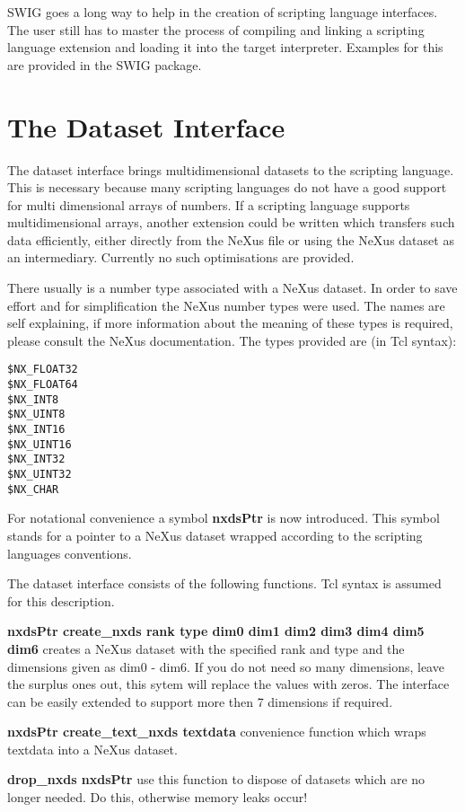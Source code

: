 \documentclass[12pt,a4paper]{article}
\begin{document}
SWIG goes a long way to help in the creation of scripting language
interfaces. The user still has to master the process of compiling and
linking a scripting language extension and loading it into the target
interpreter. Examples for this are provided in the SWIG package.  


\section{The Dataset Interface}
The dataset interface brings multidimensional datasets  to the
scripting language. This is necessary because many scripting languages
do not have a good support for multi dimensional arrays of numbers. 
If a scripting language supports
multidimensional  arrays, another extension could be written which
transfers such data efficiently, either directly from the NeXus file
or using the NeXus dataset as an intermediary. 
Currently no such optimisations are provided.  

There usually is a number type associated with a NeXus dataset. In
order to save effort and for simplification the NeXus number types
were used. The names are self explaining, if more information about
the meaning of these types is required, please consult the NeXus
documentation. The types provided are (in Tcl syntax):
\begin{verbatim}  
$NX_FLOAT32
$NX_FLOAT64
$NX_INT8  
$NX_UINT8   
$NX_INT16
$NX_UINT16
$NX_INT32
$NX_UINT32
$NX_CHAR
\end{verbatim}

For notational convenience a symbol {\bf nxdsPtr} is now
introduced. This symbol stands for a pointer to a NeXus dataset
wrapped according to the scripting languages conventions.  


The dataset interface consists of the following functions. Tcl syntax
is assumed for this description. 

{\bf nxdsPtr create\_nxds rank type dim0 dim1 dim2 dim3 dim4 dim5 dim6}
creates a NeXus dataset with the specified rank and type and the
dimensions given as dim0 - dim6. If you do not need so many
dimensions, leave the surplus ones out, this sytem will replace the
values with zeros. The interface can be easily extended to support
more then 7 dimensions if required.  

{\bf nxdsPtr create\_text\_nxds textdata} convenience function which
wraps textdata into a NeXus dataset.

{\bf drop\_nxds nxdsPtr} use this function to dispose of datasets which
are no longer needed.  Do this, otherwise memory leaks occur!
\end{document}
